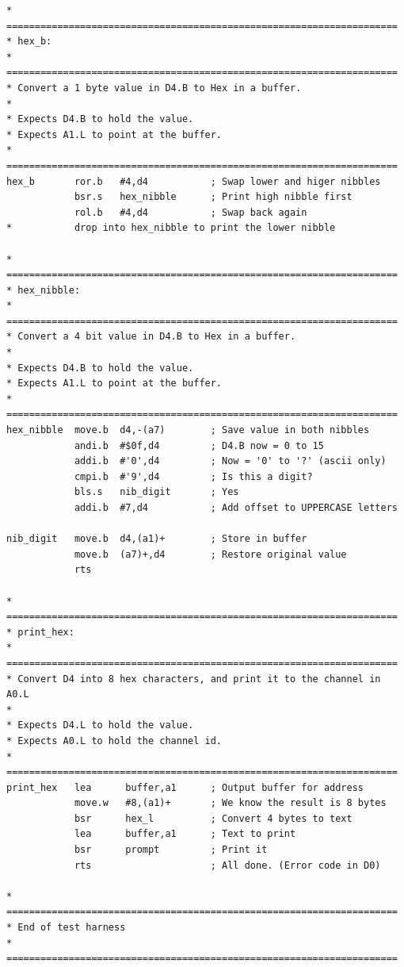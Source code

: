 \begin{lstlisting}[firstnumber=last,caption={Linked Lists - Wrapper - Part 2},label={LinkedListsWrapperPart2}]
* =====================================================================
* hex_b:
* =====================================================================
* Convert a 1 byte value in D4.B to Hex in a buffer.
*
* Expects D4.B to hold the value.
* Expects A1.L to point at the buffer.
* =====================================================================
hex_b       ror.b   #4,d4           ; Swap lower and higer nibbles
            bsr.s   hex_nibble      ; Print high nibble first
            rol.b   #4,d4           ; Swap back again
*           drop into hex_nibble to print the lower nibble

* =====================================================================
* hex_nibble:
* =====================================================================
* Convert a 4 bit value in D4.B to Hex in a buffer.
*
* Expects D4.B to hold the value.
* Expects A1.L to point at the buffer.
* =====================================================================
hex_nibble  move.b  d4,-(a7)        ; Save value in both nibbles
            andi.b  #$0f,d4         ; D4.B now = 0 to 15
            addi.b  #'0',d4         ; Now = '0' to '?' (ascii only)
            cmpi.b  #'9',d4         ; Is this a digit?
            bls.s   nib_digit       ; Yes
            addi.b  #7,d4           ; Add offset to UPPERCASE letters

nib_digit   move.b  d4,(a1)+        ; Store in buffer
            move.b  (a7)+,d4        ; Restore original value
            rts

* =====================================================================
* print_hex:
* =====================================================================
* Convert D4 into 8 hex characters, and print it to the channel in A0.L
*
* Expects D4.L to hold the value.
* Expects A0.L to hold the channel id.
* =====================================================================
print_hex   lea      buffer,a1      ; Output buffer for address
            move.w   #8,(a1)+       ; We know the result is 8 bytes
            bsr      hex_l          ; Convert 4 bytes to text
            lea      buffer,a1      ; Text to print
            bsr      prompt         ; Print it
            rts                     ; All done. (Error code in D0)

* =====================================================================
* End of test harness
* =====================================================================
\end{lstlisting}

